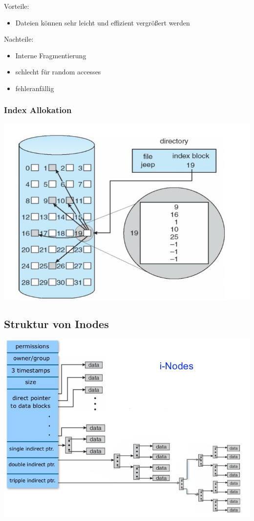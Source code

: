 \documentclass[a4paper, 10pt]{article}
\begin{document}
Vorteile:
\begin{itemize}
\item Dateien können sehr leicht und effizient vergrößert werden
\end{itemize}
Nachteile:
\begin{itemize}
\item Interne Fragmentierung
\item schlecht für random accesses
\item fehleranfällig
\end{itemize}
\newpage
\subsubsection{Index Allokation}
\includegraphics[scale=0.5]{index_allocation.jpg}

\subsection{Struktur von Inodes}
\includegraphics[scale=0.6]{inodes.jpg}
\end{document}
